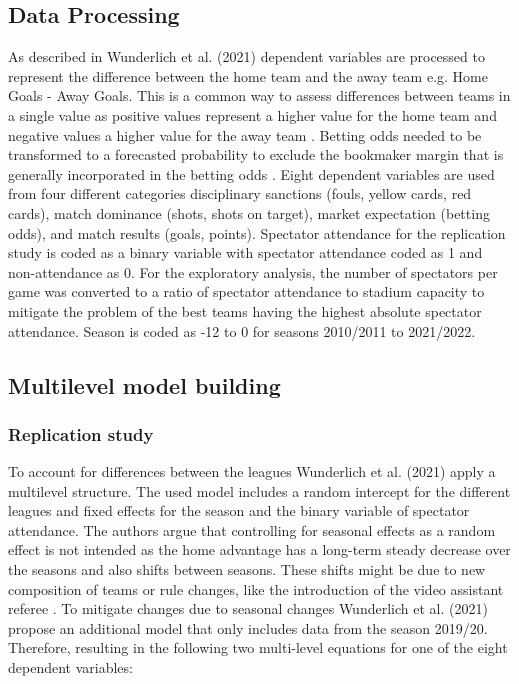 \subsection{Data Processing}
As described in Wunderlich et al. (2021) \cite{wunderlich2021does}  dependent variables are processed to represent the difference between the home team and the away team e.g. Home Goals - Away Goals. This is a common way to assess differences between teams in a single value as positive values represent a higher value for the home team and negative values a higher value for the away team \cite{wunderlich2021does}. Betting odds needed to be transformed to a forecasted probability to exclude the bookmaker margin that is generally incorporated in the betting odds \cite{wunderlich2018betting}. Eight dependent variables are used from four different categories disciplinary sanctions (fouls, yellow cards, red cards), match dominance (shots, shots on target), market expectation (betting odds), and match results (goals, points). Spectator attendance for the replication study is coded as a binary variable with spectator attendance coded as 1 and non-attendance as 0. For the exploratory analysis, the number of spectators per game was converted to a ratio of spectator attendance to stadium capacity to mitigate the problem of the best teams having the highest absolute spectator attendance. Season is coded as -12 to 0 for seasons 2010/2011 to 2021/2022.

\subsection{Multilevel model building}
\subsubsection{Replication study}
To account for differences between the leagues Wunderlich et al. (2021) \cite{wunderlich2021does} apply a multilevel structure. The used model includes a random intercept for the different leagues and fixed effects for the season and the binary variable of spectator attendance. The authors argue that controlling for seasonal effects as a random effect is not intended as the home advantage has a long-term steady decrease over the seasons and also shifts between seasons. These shifts might be due to new composition of teams or rule changes, like the introduction of the video assistant referee \cite{leitner2021no}. To mitigate changes due to seasonal changes Wunderlich et al. (2021) \cite{wunderlich2021does} propose an additional model that only includes data from the season 2019/20. Therefore, resulting in the following two multi-level equations for one of the eight dependent variables:

